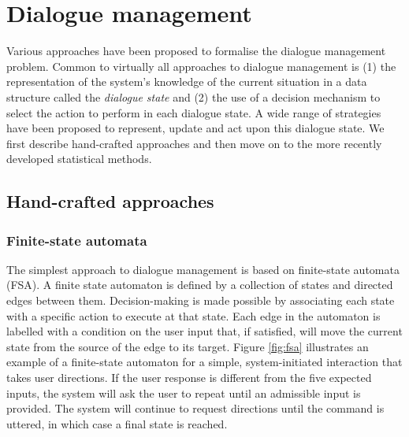 \section{Dialogue management}
\label{sec:dm}

Various approaches have been proposed to formalise the dialogue management problem.  Common to virtually all approaches to dialogue management is (1) the representation of the system's knowledge of the current situation in a data structure called the \textit{dialogue state} and (2) the use of a decision mechanism to select the action to perform in each dialogue state. A wide range of strategies have been proposed to represent, update and act upon this dialogue state.  We first describe hand-crafted approaches and then move on to the more recently developed statistical methods. 

\subsection{Hand-crafted approaches}
\label{sec:hand-crafted}

\subsubsection*{Finite-state automata}

The simplest approach to dialogue management is based on finite-state automata (FSA).  A finite state automaton is defined by a collection of states and directed edges between them.  Decision-making is made possible by associating each state with a specific action to execute at that state. Each edge in the automaton is labelled with a condition on the user input that, if satisfied, will move the current state from the source of the edge to its target.  Figure \ref{fig:fsa} illustrates an example of a finite-state automaton for a simple, system-initiated interaction that takes user directions.  If the user response is different from the five expected inputs, the system will ask the user to repeat until an admissible input is provided.  The system will continue to request directions until the  command is uttered, in which case a final state is reached. 


